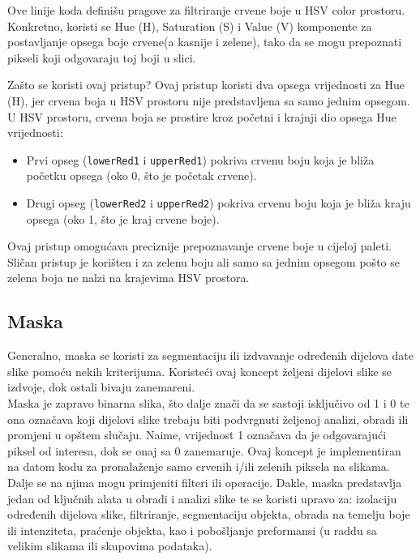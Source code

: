 \documentclass[a4paper,12pt]{article}
\begin{document}


Ove linije koda definišu pragove za filtriranje crvene boje u HSV color prostoru. 
Konkretno, koristi se Hue (H), Saturation (S) i Value (V) komponente za postavljanje opsega boje crvene(a kasnije i zelene), tako da se mogu prepoznati pikseli koji odgovaraju toj boji u slici.

Zašto se koristi ovaj pristup?
Ovaj pristup koristi dva opsega vrijednosti za Hue (H), jer crvena boja u HSV prostoru nije predstavljena sa samo jednim opsegom. 
U HSV prostoru, crvena boja se prostire kroz početni i krajnji dio opsega Hue vrijednosti:

\begin{itemize}
    \item Prvi opseg (\texttt{lowerRed1} i \texttt{upperRed1}) pokriva crvenu boju koja je bliža početku opsega (oko 0, što je početak crvene).
    \item Drugi opseg (\texttt{lowerRed2} i \texttt{upperRed2}) pokriva crvenu boju koja je bliža kraju opsega (oko 1, što je kraj crvene boje).
\end{itemize}
Ovaj pristup omogućava preciznije prepoznavanje crvene boje u cijeloj paleti. 
Sličan pristup je korišten i za zelenu boju ali samo sa jednim opsegom pošto se zelena boja ne nalzi na krajevima HSV prostora.



\subsection{Maska}
Generalno, maska se koristi za segmentaciju ili izdvavanje određenih dijelova date slike pomoću nekih kriterijuma.
Koristeći ovaj koncept željeni dijelovi slike se izdvoje, dok ostali bivaju zanemareni. \\

Maska je zapravo binarna slika, što dalje znači da se sastoji isključivo od 1 i 0 te ona označava koji dijelovi slike trebaju biti podvrgnuti željenoj analizi, obradi ili promjeni u opštem slučaju. 
Naime, vrijednost 1 označava da je odgovarajući piksel od interesa, dok se onaj sa 0 zanemaruje. 
Ovaj koncept je implementiran na datom kodu za pronalaženje samo crvenih i/ili zelenih piksela na slikama. \\

Dalje se na njima mogu primjeniti filteri ili operacije. 
Dakle, maska predstavlja jedan od ključnih alata u obradi i analizi slike te se koristi upravo za: izolaciju određenih dijelova slike, filtriranje, segmentaciju objekta, obrada na temelju boje ili intenziteta, praćenje objekta, kao i pobošljanje preformansi (u raddu sa velikim slikama ili skupovima podataka).\\
\end{document}
